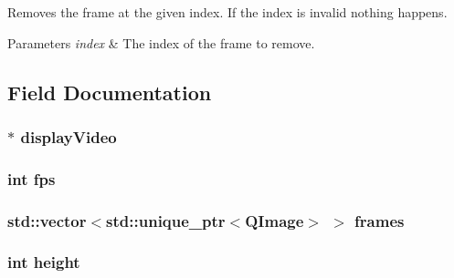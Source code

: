Removes the frame at the given index. If the index is invalid nothing happens. 


\begin{DoxyParams}{Parameters}
{\em index} & The index of the frame to remove.\\
\hline
\end{DoxyParams}


\subsection{Field Documentation}
\hypertarget{classGUI_1_1Video_ab3171c486c08dcb68f05c418ec4c17ab}{}
\subsubsection[{display\+Video}]{$\ast$ display\+Video}\label{classGUI_1_1Video_ab3171c486c08dcb68f05c418ec4c17ab}
\hypertarget{classGUI_1_1Video_a45b67662d620a977a2cfe519f7ab6273}{}
\subsubsection[{fps}]{\setlength{\rightskip}{0pt plus 5cm}int fps\hspace{0.3cm}{\ttfamily [private]}}\label{classGUI_1_1Video_a45b67662d620a977a2cfe519f7ab6273}
\hypertarget{classGUI_1_1Video_a58a70434ce1e478b27964d9305957e2c}{}
\subsubsection[{frames}]{\setlength{\rightskip}{0pt plus 5cm}std\+::vector$<$std\+::unique\+\_\+ptr$<$Q\+Image$>$ $>$ frames\hspace{0.3cm}{\ttfamily [private]}}\label{classGUI_1_1Video_a58a70434ce1e478b27964d9305957e2c}
\hypertarget{classGUI_1_1Video_ad12fc34ce789bce6c8a05d8a17138534}{}
\subsubsection[{height}]{\setlength{\rightskip}{0pt plus 5cm}int height\hspace{0.3cm}{\ttfamily [private]}}\label{classGUI_1_1Video_ad12fc34ce789bce6c8a05d8a17138534}
\hypertarget{classGUI_1_1Video_ac579683bc7b2499eed6704c87a211234}{}
